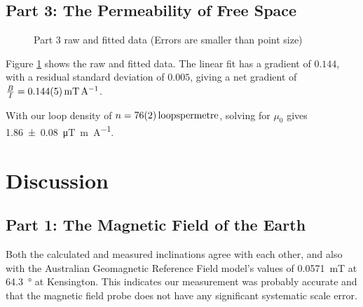 \documentclass[a4paper]{scrartcl}
\begin{document}
\subsection{Part 3: The Permeability of Free Space}
\begin{figure}
    \centering
    \caption{Part 3 raw and fitted data (Errors are smaller than point size)}
    \label{tab:part3_graph}
\end{figure}

Figure \ref{tab:part3_graph} shows the raw and fitted data. The linear fit has a gradient of \(0.144\), with a residual standard deviation of \(0.005\), giving a net gradient of \(\frac{B}{I} = \SI{0.144 \pm 0.005}{\milli\tesla\per\ampere}\).

With our loop density of \(n = \SI{76 \pm 2}{loops per metre}\), solving for \(\mu_0\) gives \SI{1.86 \pm 0.08}{\micro\tesla\metre\per\ampere}.

\section{Discussion}
\subsection{Part 1: The Magnetic Field of the Earth}
Both the calculated and measured inclinations agree with each other, and also with the Australian Geomagnetic Reference Field model's values of \SI{0.0571}{\milli\tesla} at \SI{64.3}{\degree} at Kensington. This indicates our measurement was probably accurate and that the magnetic field probe does not have any significant systematic scale error.
\end{document}
